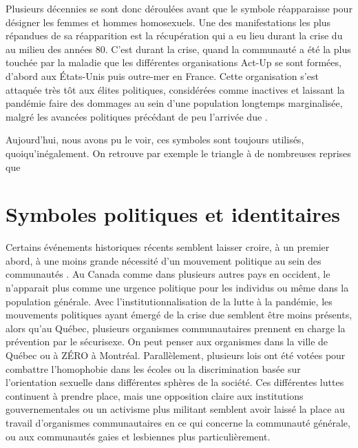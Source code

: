 Plusieurs décennies se sont donc déroulées avant que le symbole réapparaisse pour désigner les femmes et hommes homosexuels.
Une des manifestations les plus répandues de sa réapparition est la récupération qui a eu lieu durant la crise du \vih{} au milieu des années 80.
C'est durant la crise, quand la communauté \lgbt{} a été la plus touchée par la maladie que les différentes organisations Act-Up se sont formées, d'abord aux États-Unis puis outre-mer en France.
Cette organisation s'est attaquée très tôt aux élites politiques, considérées comme inactives et laissant la pandémie faire des dommages au sein d'une population longtemps marginalisée, malgré les avancées politiques précédant de peu l'arrivée due \vih{}.

Aujourd'hui, nous avons pu le voir, ces symboles sont toujours utilisés, quoiqu’inégalement.
On retrouve par exemple le triangle à de nombreuses reprises que

\section{Symboles politiques et identitaires}
\label{sec:symboles_politiques_et_identitaire}

Certains événements historiques récents semblent laisser croire, à un premier abord, à une moins grande nécessité d'un mouvement politique au sein des communautés \lgbt{}.
Au Canada comme dans plusieurs autres pays en occident, le \sida{} n'apparait plus comme une urgence politique pour les individus \lgbt{} ou même dans la population générale.
Avec l'institutionnalisation de la lutte à la pandémie, les mouvements politiques ayant émergé de la crise due \vih{} semblent être moins présents, alors qu'au Québec, plusieurs organismes communautaires prennent en charge la prévention par le sécurisexe.
On peut penser aux organismes \miels{} dans la ville de Québec ou à ZÉRO à Montréal.
Parallèlement, plusieurs lois ont été votées pour combattre l'homophobie dans les écoles ou la discrimination basée sur l'orientation sexuelle dans différentes sphères de la société.
Ces différentes luttes continuent à prendre place, mais une opposition claire aux institutions gouvernementales ou un activisme plus militant semblent avoir laissé la place au travail d'organismes communautaires en ce qui concerne la communauté \lgbt{} générale, ou aux communautés gaies et lesbiennes plus particulièrement.

